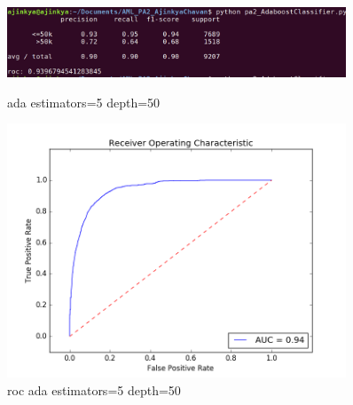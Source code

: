 \documentclass{article}
\begin{document}
\begin{figure}
    \centering
    \begin{minipage}{0.45\textwidth}
        \centering
        \includegraphics[width=0.9\textwidth]{ada_5_50.png} %
        \caption{ada estimators=5 depth=50}
    \end{minipage}\hfill
    \begin{minipage}{0.45\textwidth}
        \centering
        \includegraphics[width=0.9\textwidth]{roc_ada_5_50.png} %
        \caption{roc ada estimators=5 depth=50}
    \end{minipage}
\end{figure}
\end{document}
